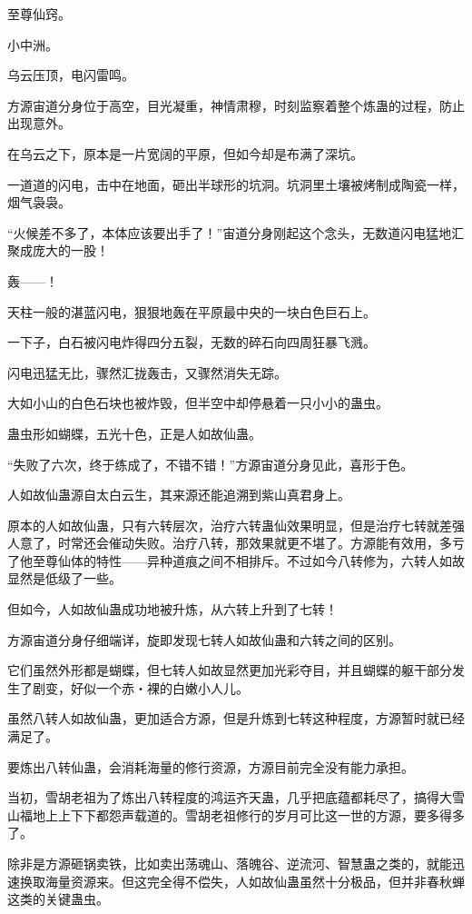 
\begin{this_body}

至尊仙窍。

小中洲。

乌云压顶，电闪雷鸣。

方源宙道分身位于高空，目光凝重，神情肃穆，时刻监察着整个炼蛊的过程，防止出现意外。

在乌云之下，原本是一片宽阔的平原，但如今却是布满了深坑。

一道道的闪电，击中在地面，砸出半球形的坑洞。坑洞里土壤被烤制成陶瓷一样，烟气袅袅。

“火候差不多了，本体应该要出手了！”宙道分身刚起这个念头，无数道闪电猛地汇聚成庞大的一股！

轰——！

天柱一般的湛蓝闪电，狠狠地轰在平原最中央的一块白色巨石上。

一下子，白石被闪电炸得四分五裂，无数的碎石向四周狂暴飞溅。

闪电迅猛无比，骤然汇拢轰击，又骤然消失无踪。

大如小山的白色石块也被炸毁，但半空中却停悬着一只小小的蛊虫。

蛊虫形如蝴蝶，五光十色，正是人如故仙蛊。

“失败了六次，终于练成了，不错不错！”方源宙道分身见此，喜形于色。

人如故仙蛊源自太白云生，其来源还能追溯到紫山真君身上。

原本的人如故仙蛊，只有六转层次，治疗六转蛊仙效果明显，但是治疗七转就差强人意了，时常还会催动失败。治疗八转，那效果就更不堪了。方源能有效用，多亏了他至尊仙体的特性——异种道痕之间不相排斥。不过如今八转修为，六转人如故显然是低级了一些。

但如今，人如故仙蛊成功地被升炼，从六转上升到了七转！

方源宙道分身仔细端详，旋即发现七转人如故仙蛊和六转之间的区别。

它们虽然外形都是蝴蝶，但七转人如故显然更加光彩夺目，并且蝴蝶的躯干部分发生了剧变，好似一个赤・裸的白嫩小人儿。

虽然八转人如故仙蛊，更加适合方源，但是升炼到七转这种程度，方源暂时就已经满足了。

要炼出八转仙蛊，会消耗海量的修行资源，方源目前完全没有能力承担。

当初，雪胡老祖为了炼出八转程度的鸿运齐天蛊，几乎把底蕴都耗尽了，搞得大雪山福地上上下下都怨声载道的。雪胡老祖修行的岁月可比这一世的方源，要多得多了。

除非是方源砸锅卖铁，比如卖出荡魂山、落魄谷、逆流河、智慧蛊之类的，就能迅速换取海量资源来。但这完全得不偿失，人如故仙蛊虽然十分极品，但并非春秋蝉这类的关键蛊虫。


\end{this_body}

